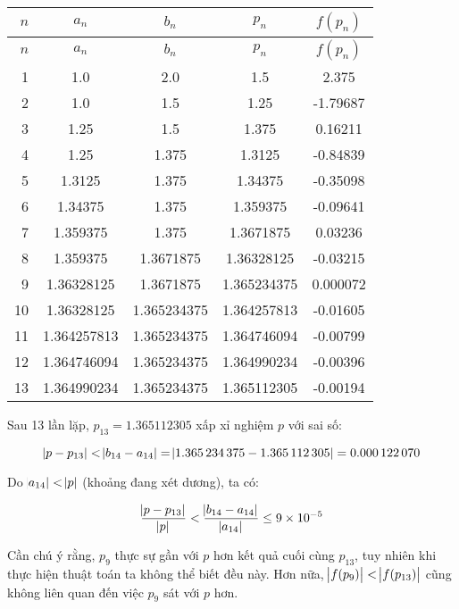 \documentclass[../../Lectures]{subfiles}
\begin{document}
\begin{exmp}
    \begin{longtable}{ r S[table-format=1.9] S[table-format=1.9] S[table-format=1.9] S[table-format=-1.6] }    %
        \toprule
         {\(n\)} &   {\(a_n\)}   &   {\(b_n\)}   &   {\(p_n\)}   & {\(f(p_n)\)} \\
        \midrule
        \endfirsthead
         {\(n\)} &   {\(a_n\)}   &   {\(b_n\)}   &   {\(p_n\)}   & {\(f(p_n)\)} \\
        \midrule
          &  1.0          &  2.0          &  1.5          &   2.375      \\
              2  &  1.0          &  1.5          &  1.25         &  -1.79687    \\
              3  &  1.25         &  1.5          &  1.375        &   0.16211    \\
              4  &  1.25         &  1.375        &  1.3125       &  -0.84839    \\
              5  &  1.3125       &  1.375        &  1.34375      &  -0.35098    \\
              6  &  1.34375      &  1.375        &  1.359375     &  -0.09641    \\
              7  &  1.359375     &  1.375        &  1.3671875    &   0.03236    \\
              8  &  1.359375     &  1.3671875    &  1.36328125   &  -0.03215    \\
              9  &  1.36328125   &  1.3671875    &  1.365234375  &   0.000072   \\
             10  &  1.36328125   &  1.365234375  &  1.364257813  &  -0.01605    \\
             11  &  1.364257813  &  1.365234375  &  1.364746094  &  -0.00799    \\
             12  &  1.364746094  &  1.365234375  &  1.364990234  &  -0.00396    \\
             13  &  1.364990234  &  1.365234375  &  1.365112305  &  -0.00194    \\
        \bottomrule
    \end{longtable}

    Sau 13 lần lặp, \(p_{13} = \num{1.365112305}\) xấp xỉ nghiệm \(p\) với sai số:

    \[\abs{p - p_{13}} < \abs{b_{14} - a_{14}} = \abs{\num{1.365234375} - \num{1.365112305}} = \num{0.000122070}\]

    Do \(\abs{a_{14}} < \abs{p}\) (khoảng đang xét dương), ta có:

    \[\frac{\abs{p - p_{13}}}{\abs{p}} < \frac{\abs{b_{14} - a_{14}}}{\abs{a_{14}}} \leq \num{9e-5}\]

    Cần chú ý rằng, \(p_9\) thực sự gần với \(p\) hơn kết quả cuối cùng
    \(p_{13}\), tuy nhiên khi thực hiện thuật toán ta không thể biết đều này.
    Hơn nữa, \(\abs{f(p_9)} < \abs{f(p_{13})}\) cũng không liên quan đến việc
    \(p_9\) sát với \(p\) hơn.
\end{exmp}
\end{document}

